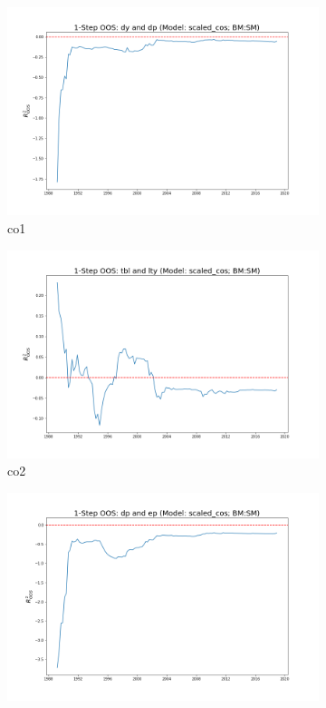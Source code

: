 \documentclass[a4paper,12pt,times,numbered,print,index]{report}
\numberwithin{equation}{section}
\begin{document}
	\begin{figure}[!htbp]
		\centering
		\caption{OOS Results for Model with $f_4$}
		\begin{subfigure}[b]{0.42\linewidth}
			\includegraphics[width=0.9\linewidth]{OOS_plots/scaled_cos_co1_SM.png}
			\caption{co1}
		\end{subfigure}
		\begin{subfigure}[b]{0.42\linewidth}
			\includegraphics[width=0.9\linewidth]{OOS_plots/scaled_cos_co2_SM.png}
			\caption{co2}
		\end{subfigure}
		\begin{subfigure}[b]{0.42\linewidth}
			\includegraphics[width=0.9\linewidth]{OOS_plots/scaled_cos_co3_SM.png}

\end{subfigure}
\end{figure}
\end{document}
